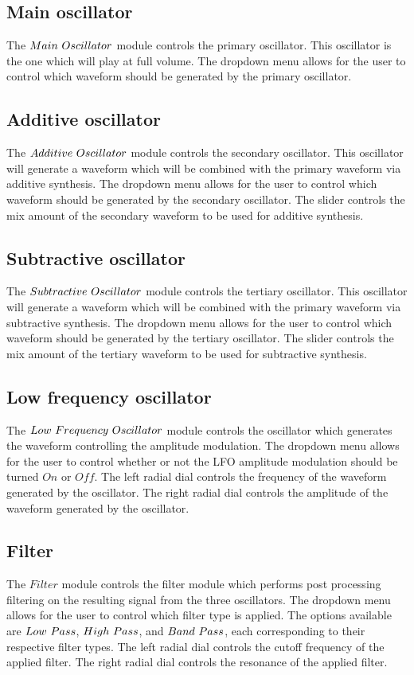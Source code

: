 \documentclass[a4paper,12pt]{report}
\begin{document}
\subsection{Main oscillator}
\label{subsec:mainosc}
The $Main\ \-Oscillator$ module controls the primary oscillator. This oscillator is the one which will play at full volume. The dropdown menu allows for the user to control which waveform should be generated by the primary oscillator.


\subsection{Additive oscillator}
\label{subsec:addosc}
The $Additive\ \-Oscillator$ module controls the secondary oscillator. This oscillator will generate a waveform which will be combined with the primary waveform via additive synthesis. The dropdown menu allows for the user to control which waveform should be generated by the secondary oscillator. The slider controls the mix amount of the secondary waveform to be used for additive synthesis.

\subsection{Subtractive oscillator}
\label{subsec:subosc}
The $Subtractive\ \-Oscillator$ module controls the tertiary oscillator. This oscillator will generate a waveform which will be combined with the primary waveform via subtractive synthesis. The dropdown menu allows for the user to control which waveform should be generated by the tertiary oscillator. The slider controls the mix amount of the tertiary waveform to be used for subtractive synthesis.

\subsection{Low frequency oscillator}
\label{subsec:lfo}
The $Low\ \-Frequency\ \-Oscillator$ module controls the oscillator which generates the waveform controlling the amplitude modulation. The dropdown menu allows for the user to control whether or not the LFO amplitude modulation should be turned $On$ or $Off$. The left radial dial controls the frequency of the waveform generated by the oscillator. The right radial dial controls the amplitude of the waveform generated by the oscillator.

\subsection{Filter}
\label{subsec:filter}
The $Filter$ module controls the filter module which performs post processing filtering on the resulting signal from the three oscillators. The dropdown menu allows for the user to control which filter type is applied. The options available are $Low\ \-Pass$, $High\ \-Pass$, and $Band\ \-Pass$, each corresponding to their respective filter types. The left radial dial controls the cutoff frequency of the applied filter. The right radial dial controls the resonance of the applied filter.
\end{document}
